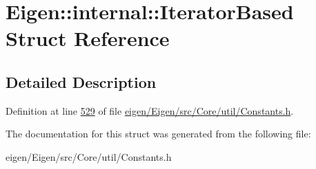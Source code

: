 \hypertarget{struct_eigen_1_1internal_1_1_iterator_based}{}\section{Eigen\+:\+:internal\+:\+:Iterator\+Based Struct Reference}
\label{struct_eigen_1_1internal_1_1_iterator_based}


\subsection{Detailed Description}


Definition at line \hyperlink{eigen_2_eigen_2src_2_core_2util_2_constants_8h_source_l00529}{529} of file \hyperlink{eigen_2_eigen_2src_2_core_2util_2_constants_8h_source}{eigen/\+Eigen/src/\+Core/util/\+Constants.\+h}.



The documentation for this struct was generated from the following file\+:\begin{DoxyCompactItemize}
\item 
eigen/\+Eigen/src/\+Core/util/\+Constants.\+h\end{DoxyCompactItemize}
